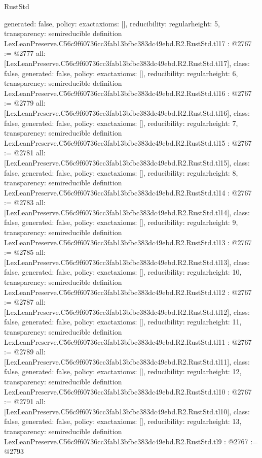 \begin{lexlean}{RustStd}
\begin{coremodule}
{  generated: false,
  policy: exact{axioms: []},
  reducibility: regular{height: 5},
  transparency: semireducible
}
definition LexLeanPreserve.C56c9f60736cc3fab13bfbc383dc49ebd.R2.RustStd.tl17 : @2767 := @2777 {
  all: [LexLeanPreserve.C56c9f60736cc3fab13bfbc383dc49ebd.R2.RustStd.tl17],
  class: false,
  generated: false,
  policy: exact{axioms: []},
  reducibility: regular{height: 6},
  transparency: semireducible
}
definition LexLeanPreserve.C56c9f60736cc3fab13bfbc383dc49ebd.R2.RustStd.tl16 : @2767 := @2779 {
  all: [LexLeanPreserve.C56c9f60736cc3fab13bfbc383dc49ebd.R2.RustStd.tl16],
  class: false,
  generated: false,
  policy: exact{axioms: []},
  reducibility: regular{height: 7},
  transparency: semireducible
}
definition LexLeanPreserve.C56c9f60736cc3fab13bfbc383dc49ebd.R2.RustStd.tl15 : @2767 := @2781 {
  all: [LexLeanPreserve.C56c9f60736cc3fab13bfbc383dc49ebd.R2.RustStd.tl15],
  class: false,
  generated: false,
  policy: exact{axioms: []},
  reducibility: regular{height: 8},
  transparency: semireducible
}
definition LexLeanPreserve.C56c9f60736cc3fab13bfbc383dc49ebd.R2.RustStd.tl14 : @2767 := @2783 {
  all: [LexLeanPreserve.C56c9f60736cc3fab13bfbc383dc49ebd.R2.RustStd.tl14],
  class: false,
  generated: false,
  policy: exact{axioms: []},
  reducibility: regular{height: 9},
  transparency: semireducible
}
definition LexLeanPreserve.C56c9f60736cc3fab13bfbc383dc49ebd.R2.RustStd.tl13 : @2767 := @2785 {
  all: [LexLeanPreserve.C56c9f60736cc3fab13bfbc383dc49ebd.R2.RustStd.tl13],
  class: false,
  generated: false,
  policy: exact{axioms: []},
  reducibility: regular{height: 10},
  transparency: semireducible
}
definition LexLeanPreserve.C56c9f60736cc3fab13bfbc383dc49ebd.R2.RustStd.tl12 : @2767 := @2787 {
  all: [LexLeanPreserve.C56c9f60736cc3fab13bfbc383dc49ebd.R2.RustStd.tl12],
  class: false,
  generated: false,
  policy: exact{axioms: []},
  reducibility: regular{height: 11},
  transparency: semireducible
}
definition LexLeanPreserve.C56c9f60736cc3fab13bfbc383dc49ebd.R2.RustStd.tl11 : @2767 := @2789 {
  all: [LexLeanPreserve.C56c9f60736cc3fab13bfbc383dc49ebd.R2.RustStd.tl11],
  class: false,
  generated: false,
  policy: exact{axioms: []},
  reducibility: regular{height: 12},
  transparency: semireducible
}
definition LexLeanPreserve.C56c9f60736cc3fab13bfbc383dc49ebd.R2.RustStd.tl10 : @2767 := @2791 {
  all: [LexLeanPreserve.C56c9f60736cc3fab13bfbc383dc49ebd.R2.RustStd.tl10],
  class: false,
  generated: false,
  policy: exact{axioms: []},
  reducibility: regular{height: 13},
  transparency: semireducible
}
definition LexLeanPreserve.C56c9f60736cc3fab13bfbc383dc49ebd.R2.RustStd.tl9 : @2767 := @2793 {
}
\end{coremodule}
\end{lexlean}
